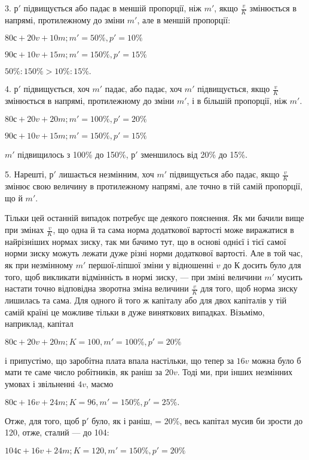 3. $р'$ підвищується або падає в меншій пропорції, ніж $m'$,
якщо $\frac{v}{K}$ змінюється в напрямі, протилежному до зміни $m'$, але
в меншій пропорції:

\begin{center}
$80с + 20 v + 10 m; m' = 50\%, p' = 10\%$

$90 с + 10 v + 15 m; m' = 150\%, p' = 15\%$

$50\% : 150\% > 10\% : 15\%.$
\end{center}

4. $р'$ підвищується, хоч $m'$ падає, або падає, хоч $m'$ підвищується,
якщо $\frac{v}{K}$ змінюється в напрямі, протилежному до зміни
$m'$, і в більшій пропорції, ніж $m'$.

\begin{center}
$80с + 20 v + 20 m; m' = 100\%, p' = 20\%$

$90 с + 10 v + 15 m; m' = 150\%, p' = 15\%$
\end{center}

\noindent $m'$ підвищилось з 100\% до 150\%, $р'$ зменшилось від 20\% до 15\%.

5. Нарешті, $р'$ лишається незмінним, хоч $m'$ підвищується або
падає, якщо $\frac{v}{K}$ змінює свою величину в протилежному напрямі,
але точно в тій самій пропорції, що й $m'$.

Тільки цей останній випадок потребує ще деякого пояснення.
Як ми бачили вище при змінах $\frac{v}{K}$, що одна й та сама норма
додаткової вартості може виражатися в найрізніших нормах
зиску, так ми бачимо тут, що в основі однієї і тієї самої норми
зиску можуть лежати дуже різні норми додаткової вартості.
Але в той час, як при незмінному $m'$ першої-ліпшої зміни у відношенні
$v$ до $К$ досить було для того, щоб викликати відмінність
в нормі зиску, $—$ при зміні величини $m'$ мусить настати точно
відповідна зворотна зміна величини $\frac{v}{K}$ для того, щоб норма
зиску лишилась та сама. Для одного й того ж капіталу або для
двох капіталів у тій самій країні це можливе тільки в дуже
виняткових випадках. Візьмімо, наприклад, капітал

\begin{center}
$80с + 20 v + 20 m; K = 100, m' = 100\%, p' = 20\%$
\end{center}

\noindent і припустімо, що заробітна плата впала настільки, що тепер за
$16 v$ можна було б мати те саме число робітників, як раніш за
$20 v$. Тоді ми, при інших незмінних умовах і звільненні $4 v$,
маємо

\begin{center}
$80с + 16 v + 24 m; K = 96, m' = 150\%, p' = 25\%.$
\end{center}

Отже, для того, щоб $р'$ було, як і раніш, = 20\%, весь капітал
мусив би зрости до 120, отже, сталий $—$ до 104:

\begin{center}
$104 с + 16 v + 24 m; K = 120, m' = 150\%, p' = 20\%$
\end{center}
